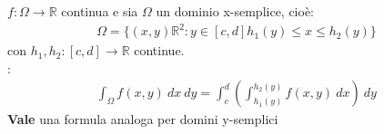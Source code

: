 \documentclass[a4paper, oneside]{article}
\begin{document}
\begin{theorem}
     $f:\Omega \to \mathbb{R}$ continua e sia $\Omega$ un dominio x-semplice, cioè:
    \begin{gather*}
        \Omega = \{ (x,y) \mathbb{R}^2: y \in[c,d] h_1(y) \leq x \leq h_2(y)\}
    \end{gather*}
    con $h_1,h_2:[c,d] \to \mathbb{R}$ continue.\\
    :
    \begin{gather*}
        \int_{\Omega} f(x,y) \ dx \ dy = \int_{c}^{d} \left( \int_{h_1(y)}^{h_2(y)} f(x,y) \ dx \right) \ dy
    \end{gather*}
\textbf{Vale} una formula analoga per domini y-semplici
\end{theorem}
\end{document}
